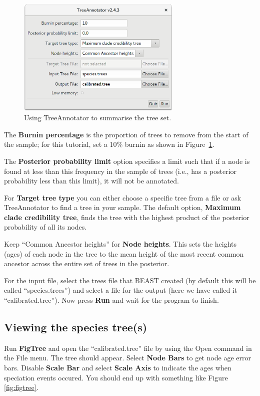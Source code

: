 \documentclass{article}
\begin{document}
\begin{figure}[htb!]
\centering
\includegraphics[width=0.7\textwidth]{figures/treeannotator-calibrated.png}
\caption{Using TreeAnnotator to summarise the tree set.}
\label{fig:treeannotator}
\end{figure}

The \textbf{Burnin percentage} is the proportion of trees to remove from the
start of the sample; for this tutorial, set a 10\% burnin as shown in
Figure~\ref{fig:treeannotator}.

The \textbf{Posterior probability limit} option specifies a limit such that if a
node is found at less than this frequency in the sample of trees (i.e., has a
posterior probability less than this limit), it will not be annotated.

For \textbf{Target tree type} you can either choose a specific tree from a file
or ask TreeAnnotator to find a tree in your sample. The default option,
\textbf{Maximum clade credibility tree}, finds the tree with the highest product
of the posterior probability of all its nodes.

Keep ``Common Ancestor heights'' for \textbf{Node heights}. This sets the
heights (ages) of each node in the tree to the mean height of the most recent
common ancestor across the entire set of trees in the posterior.

For the input file, select the trees file that BEAST created (by default this
will be called ``species.trees'') and select a file for the output (here we
have called it ``calibrated.tree''). Now press \textbf{Run} and wait for the
program to finish.

\subsection*{Viewing the species tree(s)}

Run \textbf{FigTree} and open the ``calibrated.tree'' file by using the
Open command in the File menu. The tree should appear. Select \textbf{Node
Bars} to get node age error bars. Disable \textbf{Scale Bar} and select
\textbf{Scale Axis} to indicate the ages when speciation events occured. You
should end up with something like Figure \ref{fig:figtree}.
\end{document}
